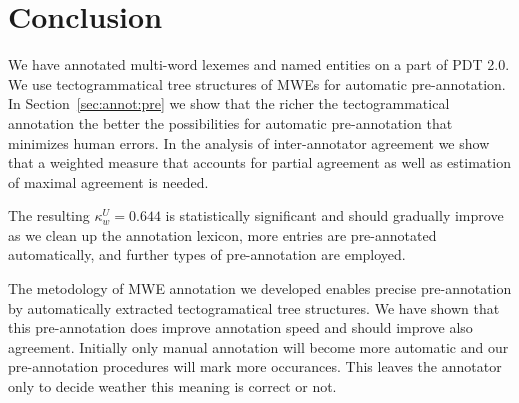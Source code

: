 
\chapter{Conclusion}
\label{sec:conclusion}
We have annotated multi-word lexemes and named entities on a part of PDT 2.0. We use tectogrammatical tree structures of MWEs for automatic pre-annotation. In Section~\ref{sec:annot:pre} we show that the richer the tectogrammatical annotation the better the possibilities for automatic pre-annotation that minimizes human errors. In the analysis of inter-annotator agreement we show that a weighted measure that accounts for partial agreement as well as estimation of maximal agreement is needed. 

The resulting $\kappa_w^U = 0.644$ is statistically significant and should gradually improve as we clean up the annotation lexicon, more entries are pre-annotated automatically, and further types of pre-annotation are employed.

The metodology of MWE annotation we developed enables precise pre-annotation by automatically extracted tectogramatical tree structures. We have shown that this pre-annotation does improve annotation speed and should improve also agreement. Initially only manual annotation will become more automatic and our pre-annotation procedures will mark more occurances. This leaves the annotator only to decide weather this meaning is correct or not.